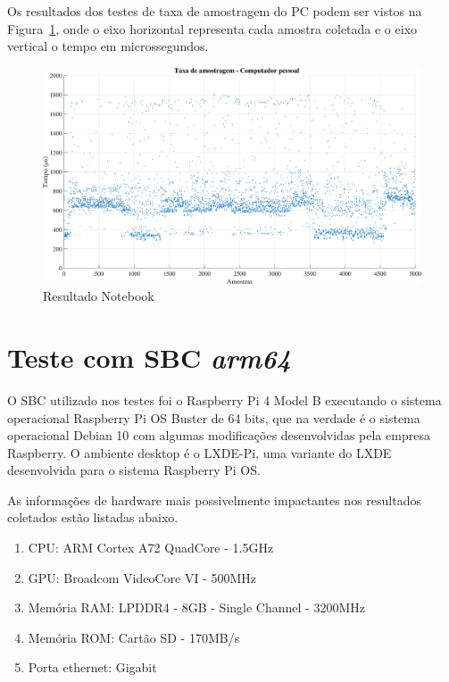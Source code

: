         Os resultados dos testes de taxa de amostragem do \ac{PC} podem ser vistos na Figura~\ref{fig:resultado_notebook}, onde o eixo horizontal representa cada amostra coletada e o eixo vertical o tempo em microssegundos.
        
        \begin{figure}[h]
            \centering
            \includegraphics[width=\columnwidth]{imagens/Resultados/testeNote.eps}
            \small 
            \centering 
            \caption{Resultado Notebook}
            \label{fig:resultado_notebook}
        \end{figure}
    
    \section{Teste com SBC \textit{arm64}}
        
        O \ac{SBC} utilizado nos testes foi o Raspberry Pi 4 Model B executando o sistema operacional Raspberry Pi OS Buster de 64 bits, que na verdade é o sistema operacional Debian 10 com algumas modificações desenvolvidas pela empresa Raspberry. O ambiente desktop é o LXDE-Pi, uma variante do LXDE desenvolvida para o sistema Raspberry Pi OS.
        
        As informações de hardware mais possivelmente impactantes nos resultados coletados estão listadas abaixo.
        \begin{enumerate}
            \item CPU: ARM Cortex A72 QuadCore - 1.5GHz
            \item GPU: Broadcom VideoCore VI - 500MHz
            \item Memória RAM: LPDDR4 - 8GB - Single Channel - 3200MHz
            \item Memória ROM: Cartão SD - 170MB/s
            \item Porta ethernet: Gigabit
        \end{enumerate}
        
